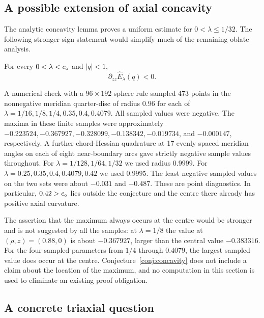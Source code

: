 \subsection{A possible extension of axial concavity}

The analytic concavity lemma proves a uniform estimate for
$0<\lambda\leq1/32$.  The following stronger sign statement
would simplify much of the remaining oblate analysis.

\begin{conjecture}\label{conj:concavity}
For every $0<\lambda<c_{\mathrm o}$ and $|q|<1$,
\[
 \partial_{zz}\widehat E_\lambda(q)<0.
\]
\end{conjecture}

A numerical check with a $96\times192$ sphere rule sampled
473 points in the nonnegative meridian quarter-disc of radius
$0.96$ for each of
$\lambda=1/16,1/8,1/4,0.35,0.4,0.4079$.
All sampled values were negative.  The maxima in these finite
samples were approximately
$-0.223524,-0.367927,-0.328099,-0.138342,-0.019734$,
and $-0.000147$, respectively.
A further chord-Hessian quadrature at 17 evenly spaced meridian angles on each of eight near-boundary arcs gave strictly negative sample values throughout. For $\lambda=1/128,1/64,1/32$ we used radius $0.9999$. For $\lambda=0.25,0.35,0.4,0.4079,0.42$ we used $0.9995$. The least negative sampled values on the two sets were about $-0.031$ and $-0.487$. These are point diagnostics. In particular, $0.42>c_{\mathrm o}$ lies outside the conjecture and the centre there already has positive axial curvature.

The assertion that the maximum always occurs at the centre would
be stronger and is not suggested by all the samples: at
$\lambda=1/8$ the value at $(\rho,z)=(0.88,0)$ is about
$-0.367927$, larger than the central value $-0.383316$.
For the four sampled parameters from $1/4$ through $0.4079$,
the largest sampled value does occur at the centre.
Conjecture~\ref{conj:concavity} does not include a claim about
the location of the maximum, and no computation in this section
is used to eliminate an existing proof obligation.

\subsection{A concrete triaxial question}

